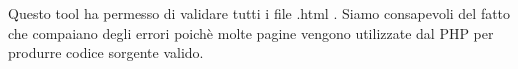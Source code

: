 Questo tool ha permesso di validare tutti i file .html . Siamo consapevoli del fatto che compaiano degli errori poichè molte pagine 
vengono utilizzate dal PHP per produrre codice sorgente valido.